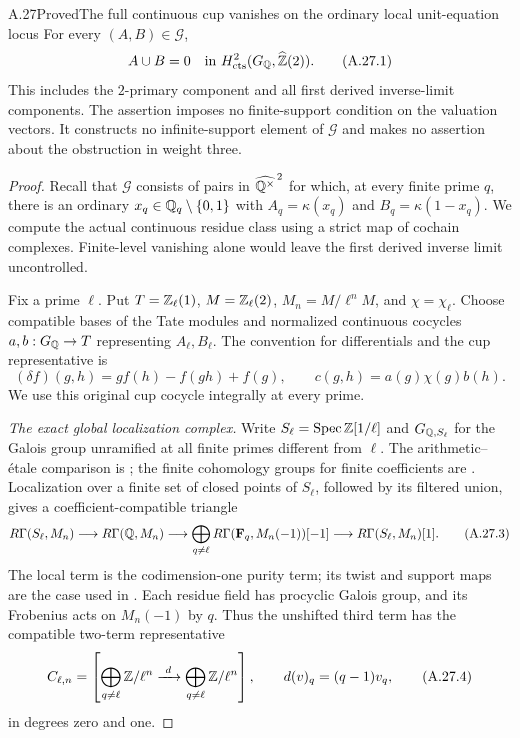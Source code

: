 \begin{statement}{A.27}{Proved}{The full continuous cup vanishes on the ordinary local unit-equation locus}
For every $(A,B)\in\mathcal G$,
\[
 A\cup B=0
 \quad\text{in }H^2_{\mathrm{cts}}(G_\mathbb Q,\widehat{\mathbb Z}(2)).
 \tag{A.27.1}
\]
This includes the $2$-primary component and all first derived
inverse-limit components. The assertion imposes no finite-support
condition on the valuation vectors. It constructs no
infinite-support element of $\mathcal G$ and makes no assertion
about the obstruction in weight three.
\end{statement}
\begin{proof}
Recall that $\mathcal G$ consists of pairs in
$\widehat{\mathbb Q^\times}^{\,2}$ for which, at every finite prime $q$,
there is an ordinary $x_q\in\mathbb Q_q\setminus\{0,1\}$ with
$A_q=\kappa(x_q)$ and $B_q=\kappa(1-x_q)$.
We compute the actual continuous residue class using a strict
map of cochain complexes. Finite-level vanishing alone would
leave the first derived inverse limit uncontrolled.

Fix a prime $\ell$. Put $T=\mathbb Z_\ell(1)$,
$M=\mathbb Z_\ell(2)$, $M_n=M/\ell^nM$, and $\chi=\chi_\ell$.
Choose compatible bases of the Tate modules and normalized
continuous cocycles $a,b:G_\mathbb Q\to T$ representing $A_\ell,B_\ell$.
The convention for differentials and the cup representative is
\[
 (\delta f)(g,h)=g f(h)-f(gh)+f(g),\qquad
 c(g,h)=a(g)\chi(g)b(h).
 \tag{A.27.2}
\]
We use this original cup cocycle integrally at every prime.

\emph{The exact global localization complex.}
Write $S_\ell=\operatorname{Spec}\mathbb Z[1/\ell]$ and
$G_{\mathbb Q,S_\ell}$ for the Galois group unramified at all finite
primes different from $\ell$. The arithmetic--\'etale comparison
is \cite[II, Proposition 2.9]{BIR_MilneADT}; the finite
cohomology groups for finite coefficients are
\cite[I, Corollary 4.15]{BIR_MilneADT}.
Localization over a finite set of closed points of $S_\ell$,
followed by its filtered union, gives a coefficient-compatible
triangle
\[
 R\Gamma(S_\ell,M_n)\longrightarrow R\Gamma(\mathbb Q,M_n)
 \longrightarrow
 \bigoplus_{q\ne\ell}R\Gamma(\mathbf F_q,M_n(-1))[-1]
 \longrightarrow R\Gamma(S_\ell,M_n)[1].
 \tag{A.27.3}
\]
The local term is the codimension-one purity term; its twist
and support maps are the case used in
\cite[\S3, (3.15)--(3.20)]{BIR_Jannsen1988}.
Each residue field has procyclic Galois group, and its
Frobenius acts on $M_n(-1)$ by $q$. Thus the unshifted third
term has the compatible two-term representative
\[
 C_{\ell,n}=
 \left[\bigoplus_{q\ne\ell}\mathbb Z/\ell^n
       \xrightarrow{\ d\ }
       \bigoplus_{q\ne\ell}\mathbb Z/\ell^n\right],
 \qquad d(v)_q=(q-1)v_q,
 \tag{A.27.4}
\]
in degrees zero and one.


\end{proof}
